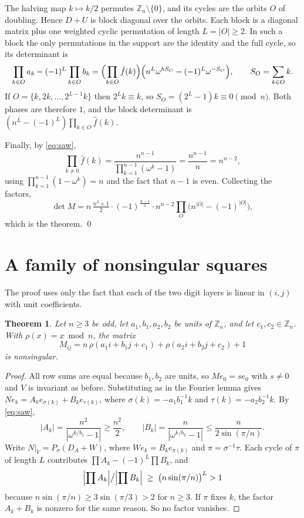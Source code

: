 \documentclass[11pt]{amsart}
\newtheorem{theorem}{Theorem}
\theoremstyle{remark}
\newcommand{\Z}{\mathbb{Z}}
\begin{document}
The halving map $k\mapsto k/2$ permutes $\Z_n\setminus\{0\}$, and its cycles are the orbits $O$ of doubling.
Hence $D+U$ is block diagonal over the orbits. Each block is a diagonal matrix plus one weighted cyclic permutation
of length $L=|O|\geq2$. In such a block the only permutations in the support are the identity and the full cycle,
so its determinant is
\[
\prod_{k\in O}a_k-(-1)^{L}\prod_{k\in O}b_k
= \Bigl(\prod_{k\in O}\hat f(k)\Bigr)\Bigl(n^{L}\omega^{hS_O}-(-1)^{L}\omega^{-S_O}\Bigr),
\qquad S_O=\sum_{k\in O}k .
\]
If $O=\{k,2k,\dots,2^{L-1}k\}$ then $2^{L}k\equiv k$, so $S_O=(2^{L}-1)k\equiv0\pmod n$. Both phases are therefore
$1$, and the block determinant is $(n^{L}-(-1)^{L})\prod_{k\in O}\hat f(k)$.

Finally, by \eqref{eq:saw},
\[
\prod_{k\neq0}\hat f(k)=\frac{n^{n-1}}{\prod_{k=1}^{n-1}(\omega^k-1)}=\frac{n^{n-1}}{n}=n^{n-2},
\]
using $\prod_{k=1}^{n-1}(1-\omega^k)=n$ and the fact that $n-1$ is even. Collecting the factors,
\[
\det M = n\,\tfrac{n^2+1}{2}\cdot(-1)^{\frac{n-1}{2}}\cdot n^{n-2}\prod_O\bigl(n^{|O|}-(-1)^{|O|}\bigr),
\]
which is the theorem. \qed

\section{A family of nonsingular squares}

The proof uses only the fact that each of the two digit layers is linear in $(i,j)$ with unit coefficients.

\begin{theorem}\label{thm:family}
Let $n\geq3$ be odd, let $a_1,b_1,a_2,b_2$ be units of $\Z_n$, and let $c_1,c_2\in\Z_n$. With $\rho(x)=x\bmod n$,
the matrix
\[
M_{ij}=n\,\rho(a_1i+b_1j+c_1)+\rho(a_2i+b_2j+c_2)+1
\]
is nonsingular.
\end{theorem}

\begin{proof}
All row sums are equal because $b_1,b_2$ are units, so $M e_0=s e_0$ with $s\neq0$ and $V$ is invariant as before.
Substituting as in the Fourier lemma gives $N e_k=A_k e_{\sigma(k)}+B_k e_{\tau(k)}$, where $\sigma(k)=-a_1b_1^{-1}k$
and $\tau(k)=-a_2b_2^{-1}k$. By \eqref{eq:saw},
\[
|A_k|=\frac{n^2}{|\omega^{k/b_1}-1|}\geq\frac{n^2}{2},\qquad
|B_k|=\frac{n}{|\omega^{k/b_2}-1|}\leq\frac{n}{2\sin(\pi/n)} .
\]
Write $N|_V=P_\sigma(D_A+W)$, where $W e_k=B_k e_{\pi(k)}$ and $\pi=\sigma^{-1}\tau$. Each cycle of $\pi$ of length
$L$ contributes $\prod A_k-(-1)^L\prod B_k$, and
\[
\Bigl|\prod A_k\Bigr| \big/ \Bigl|\prod B_k\Bigr| \;\geq\; \bigl(n\sin(\pi/n)\bigr)^{L} > 1
\]
because $n\sin(\pi/n)\geq 3\sin(\pi/3)>2$ for $n\geq3$. If $\pi$ fixes $k$, the factor $A_k+B_k$ is nonzero for the same
reason. So no factor vanishes.
\end{proof}
\end{document}
